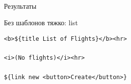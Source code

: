 \documentclass[aspectratio=169,handout,bigger]{beamer}
\begin{document}

\begin{frame}{Результаты}
\end{frame}


\begin{frame}[fragile]{Без шаблонов тяжко: list}
\begin{verbatim}
<b>${title List of Flights}</b><hr>

<i>(No flights)</i><hr>

${link new <button>Create</button>}
\end{verbatim}
\end{frame}
\end{document}
